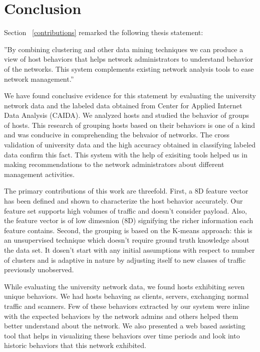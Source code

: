 
\chapter{Conclusion} \label{chap:conclusion}

Section ~\ref{contributions} remarked the following thesis statement:

''By combining clustering and other data mining techniques we can produce a view of host behaviors that helps network administrators to understand behavior of the networks. This system complements existing network analysis tools to ease network management.''

We have found conclusive evidence for this statement by evaluating the university network data and the labeled data obtained from Center for Applied Internet Data Analysis (CAIDA). We analyzed hosts and studied the behavior of groups of hosts. This research of grouping hosts based on their behaviors is one of a kind and was conducive in comprehending the behvaior of networks. The cross validation of university data and the high accuracy obtained in classifying labeled data confirm this fact. This system with the help of exisiting tools helped us in making recommendations to the network administrators about different management activities.

The primary contributions of this work are threefold. First, a 8D feature vector has been defined and shown to characterize the host behavior accurately. Our feature set supports high volumes of traffic and doesn't consider payload. Also, the feature vector is of low dimesnion (8D) signifying the richer information each feature contains.
Second, the grouping is based on the K-means approach: this is an unsupervised technique which doesn't require ground truth knowledge about the data set. It dosen't start with any initial assumptions with respect to number of clusters and is adaptive in nature by adjusting itself to new classes of traffic previously unobserved.

While evaluating the university network data, we found hosts exhibiting seven unique behaviors. We had hosts behaving as clients, servers, exchanging normal traffic and scanners. Few of these behaviors extracted by our system were inline with the expected behaviors by the network admins and others helped them better understand about the network. We also presented a web based assisting tool that helps in visualizing these behaviors over time periods and look into historic behaviors that this network exhibited.

